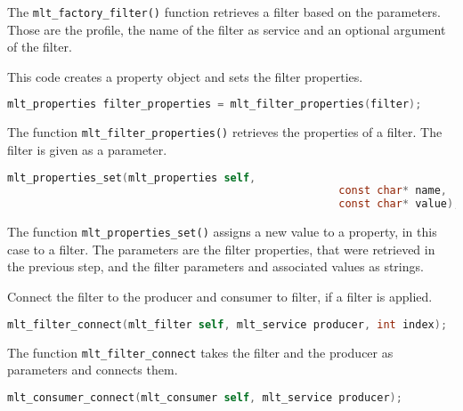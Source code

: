 \documentclass[../MasterThesis.tex]{subfiles}
\begin{document}
\begin{description}[font=\color{RedViolet!80!black}, style=nextline]
	The \texttt{mlt\_factory\_filter()} function retrieves a filter based on the parameters. Those are the profile, the name of the filter as service and an optional argument of the filter.



	\item[Create and set filter properties] 

	This code creates a property object and sets the filter properties.

	\begin{lstlisting}[language=C, numbers=none, columns=fullflexible, belowskip=0pt, aboveskip=9pt]
	mlt_properties filter_properties = mlt_filter_properties(filter); \end{lstlisting}

	The function \texttt{mlt\_filter\_properties()} retrieves the properties of a filter. The filter is given as a parameter.

	\begin{lstlisting}[language=C, numbers=none, columns=fullflexible, belowskip=0pt, aboveskip=9pt]
	mlt_properties_set(mlt_properties self, 
													const char* name, 
													const char* value); \end{lstlisting}

	The function \texttt{mlt\_properties\_set()} assigns a new value to a property, in this case to a filter. The parameters are the filter properties, that were retrieved in the previous step, and the filter parameters and associated values as strings.
	
	
	
	
	\item[Connect elements] 
	
	Connect the filter to the producer and consumer to filter, if a filter is applied.
	
	\begin{lstlisting}[language=C, numbers=none, columns=fullflexible, belowskip=0pt, aboveskip=9pt]
	mlt_filter_connect(mlt_filter self, mlt_service producer, int index); \end{lstlisting}

	The function \texttt{mlt\_filter\_connect} takes the filter and the producer as parameters and connects them.
	
	\begin{lstlisting}[language=C, numbers=none, columns=fullflexible, belowskip=0pt, aboveskip=9pt]
	mlt_consumer_connect(mlt_consumer self, mlt_service producer); \end{lstlisting}


\end{description}
\end{document}
